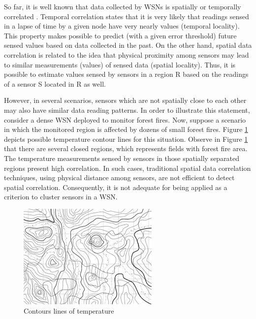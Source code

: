\documentclass{acm_proc_article-sp}
\begin{document}
So far, it is well known that data collected by WSNs is spatially or temporally 
correlated \cite{Chu2006, Villas2012, Yoon2005}. Temporal correlation states 
that it is very likely that readings sensed in a lapse of time by a 
given node have very nearly values (temporal locality). This 
property makes possible to predict (with a given error threshold) future sensed 
values based on data collected in the past. On the other hand, spatial data correlation is related to the idea that physical proximity
among sensors may lead to similar measurements (values) of sensed data (spatial locality). Thus, it is possible to estimate values sensed by sensors in a region R based on the readings of a sensor S located in R as well.
\vspace*{-.3cm}

However, in several scenarios, sensors which are not spatially close to each
other may also have similar data reading patterns. In order to illustrate this
statement, consider a dense WSN deployed to monitor forest fires.
Now, suppose a scenario in which the monitored region is affected by dozens of
small forest fires. Figure \ref{fig:contour_lines} depicts possible
temperature contour lines for this situation. Observe in Figure \ref{fig:contour_lines} that there are several closed regions, which represents fields with forest fire area. The temperature measurements sensed by sensors in those spatially separated
regions present high correlation. In such cases, traditional spatial data
correlation techniques, using physical distance among sensors, are not
efficient to detect spatial correlation. Consequently, it is not adequate for being applied as a criterion to cluster sensors in a WSN.

\begin{figure}[!htb]
\centering
	\includegraphics[scale=0.8]{I2.png}
    \caption{Contours lines of temperature}
    \label{fig:contour_lines}
\end{figure}
\vspace*{-.3cm}
\end{document}
